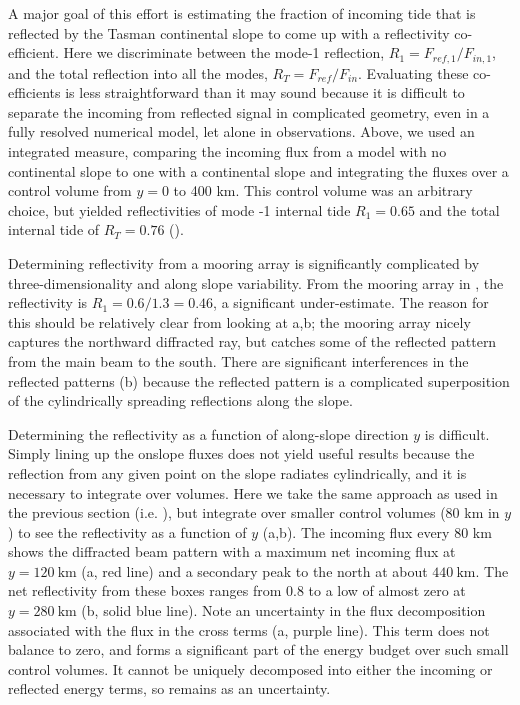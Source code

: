 \documentclass[10pt]{article}
\begin{document}
A major goal of this effort is estimating the fraction of incoming tide that is reflected by the Tasman continental slope to come up with a reflectivity co-efficient. Here we discriminate between the mode-1 reflection, $R_1=F_{ref,1}/F_{in,1}$, and the total reflection into all the modes, $R_T=F_{ref}/F_{in}$. Evaluating these co-efficients is less straightforward than it may sound because it is difficult to separate the incoming from reflected signal in complicated geometry, even in a fully resolved numerical model, let alone in observations.  Above, we used an integrated measure, comparing the incoming flux from a model with no continental slope to one with a continental slope and integrating the fluxes over a control volume from $y=$0 to 400 km.  This control volume was an arbitrary choice, but yielded reflectivities of mode -1 internal tide $R_1=0.65$ and the total internal tide of $R_T=0.76$ (). 

Determining reflectivity from a mooring array is significantly complicated by three-dimensionality and along slope variability.  From the mooring array in , the reflectivity is $R_1=0.6/1.3=0.46$, a significant under-estimate.  The reason for this should be relatively clear from looking at a,b; the mooring array nicely captures the northward diffracted ray, but catches some of the reflected pattern from the main beam to the south. There are significant interferences in the reflected patterns (b) because the reflected pattern is a complicated superposition of the cylindrically spreading reflections along the slope.  

Determining the reflectivity as a function of along-slope direction $y$ is difficult.  Simply lining up the onslope fluxes does not yield useful results because the reflection from any given point on the slope radiates cylindrically, and it is necessary to integrate over volumes.  Here we take the same approach as used in the previous section (i.e. ), but integrate over smaller control volumes (80 km in $y$) to see the reflectivity as a function of $y$ (a,b).  The incoming flux every 80 km shows the diffracted beam pattern with a maximum net incoming flux at $y=120\ \mathrm{km}$ (a, red line) and a secondary peak to the north at about $440\ \mathrm{km}$.  The net reflectivity from these boxes ranges from 0.8 to a low of almost zero at $y=280\ \mathrm{km}$ (b, solid blue line).  Note an uncertainty in the flux decomposition associated with the flux in the cross terms (a, purple line).  This term does not balance to zero, and forms a significant part of the energy budget over such small control volumes.  It cannot be uniquely decomposed into either the incoming or reflected energy terms, so remains as an uncertainty. 
\end{document}
